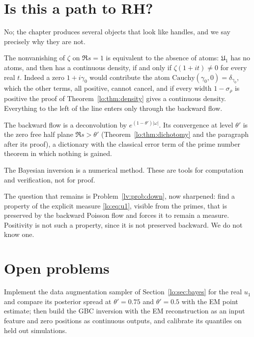 \section{Is this a path to RH?}\label{lo:sec:path}

No; the chapter produces several objects that look like handles, and we say precisely why they are not.

The nonvanishing of $\zeta$ on $\Re s=1$ is equivalent to the absence of atoms: $\mathfrak U_1$ has no atoms, and then has a continuous density, if and only if $\zeta(1+it)\ne0$ for every real $t$. Indeed a zero $1+i\gamma_0$ would contribute the atom $\mathrm{Cauchy}(\gamma_0,0)=\delta_{\gamma_0}$, which the other terms, all positive, cannot cancel, and if every width $1-\sigma_\rho$ is positive the proof of Theorem~\ref{lo:thm:density} gives a continuous density. Everything to the left of the line enters only through the backward flow.

The backward flow is a deconvolution by $e^{(1-\theta')|\omega|}$. Its convergence at level $\theta'$ is the zero free half plane $\Re s>\theta'$ (Theorem~\ref{lo:thm:dichotomy} and the paragraph after its proof), a dictionary with the classical error term of the prime number theorem in which nothing is gained.

The Bayesian inversion is a numerical method. These are tools for computation and verification, not for proof.

The question that remains is Problem~\ref{lv:prob:down}, now sharpened: find a property of the explicit measure \eqref{lo:eq:u1}, visible from the primes, that is preserved by the backward Poisson flow and forces it to remain a measure. Positivity is not such a property, since it is not preserved backward. We do not know one.

\section{Open problems}\label{lo:sec:open}

\begin{problem}\label{lo:prob:sampler}
Implement the data augmentation sampler of Section~\ref{lo:sec:bayes} for the real $u_1$ and compare its posterior spread at $\theta'=0.75$ and $\theta'=0.5$ with the EM point estimate; then build the GBC inversion with the EM reconstruction as an input feature and zero positions as continuous outputs, and calibrate its quantiles on held out simulations.
\end{problem}


